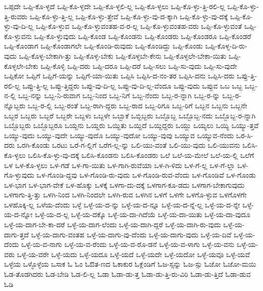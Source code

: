 {ಒಪ್ಪದೇ
ಒಪ್ಪಿ-ಕೊ-ಳ್ಳದೆ
ಒಪ್ಪಿ-ಕೊ-ಳ್ಳದೇ
ಒಪ್ಪಿ-ಕೊ-ಳ್ಳಲಿ-ಲ್ಲ
ಒಪ್ಪಿ-ಕೊ-ಳ್ಳಲು
ಒಪ್ಪಿ-ಕೊ-ಳ್ಳು-ತ್ತಿ-ರಲಿ-ಲ್ಲ
ಒಪ್ಪಿ-ಕೊ-ಳ್ಳು-ತ್ತಿ-ರುವರು
ಒಪ್ಪಿ-ಕೊ-ಳ್ಳು-ತ್ತಿ-ಲ್ಲ
ಒಪ್ಪಿ-ಕೊ-ಳ್ಳು-ತ್ತೇವೆ
ಒಪ್ಪಿ-ಕೊ-ಳ್ಳು-ವು-ದ-ಕ್ಕಾಗಿ
ಒಪ್ಪಿ-ಕೊ-ಳ್ಳು-ವು-ದಕ್ಕೆ
ಒಪ್ಪಿ-ಕೊ-ಳ್ಳು-ವು-ದಿ-ಲ್ಲ
ಒಪ್ಪಿ-ಕೊ-ಳ್ಳುವ
ಒಪ್ಪಿ-ಕೊ-ಳ್ಳುವಂತಹ-ವ-ರ-ಲ್ಲ
ಒಪ್ಪಿ-ಕೊ-ಳ್ಳುವಂತಹ-ವರು
ಒಪ್ಪಿ-ಕೊ-ಳ್ಳುವಂತೆ
ಒಪ್ಪಿ-ಕೊ-ಳ್ಳುವನು
ಒಪ್ಪಿ-ಕೊ-ಳ್ಳುವುದು
ಒಪ್ಪಿ-ಕೊಂಡ
ಒಪ್ಪಿ-ಕೊಂಡನು
ಒಪ್ಪಿ-ಕೊಂಡರು
ಒಪ್ಪಿ-ಕೊಂಡರೂ
ಒಪ್ಪಿ-ಕೊಂಡರೆ
ಒಪ್ಪಿ-ಕೊಂಡಾಗ
ಒಪ್ಪಿ-ಕೊಂಡಾಗಲೇ
ಒಪ್ಪಿ-ಕೊಂಡಿ-ರುವುದು
ಒಪ್ಪಿ-ಕೊಂಡಿದ್ದು
ಒಪ್ಪಿ-ಕೊಂಡು
ಒಪ್ಪಿ-ಕೊಳ್ಳ-ದಿ-ರು-ವುದು
ಒಪ್ಪಿ-ಕೊಳ್ಳ-ಬೇಕಾಗಿ-ತ್ತು
ಒಪ್ಪಿ-ಕೊಳ್ಳ-ಬೇಕು
ಒಪ್ಪಿ-ಕೊಳ್ಳಬೇ-ಕೇನು
ಒಪ್ಪಿ-ಕೊಳ್ಳಲೇ-ಬೇಕಾ-ಯಿತು
ಒಪ್ಪಿ-ಕೊಳ್ಳಲೇ-ಬೇಕು
ಒಪ್ಪಿ-ಕೊಳ್ಳಿ
ಒಪ್ಪಿ-ದರು
ಒಪ್ಪಿ-ದರೂ
ಒಪ್ಪಿ-ದರೆ
ಒಪ್ಪಿ-ಸಲು
ಒಪ್ಪಿ-ಸು-ವುದು
ಒಪ್ಪಿ-ಸು-ವುದೇ
ಒಪ್ಪಿಕೋ
ಒಪ್ಪಿಗೆ
ಒಪ್ಪಿಗೆ-ಯನ್ನು
ಒಪ್ಪಿಗೆ-ಯಾ-ಯಿತು
ಒಪ್ಪಿಸಿ
ಒಪ್ಪಿಸಿ-ದ-ನಂ-ತರ
ಒಪ್ಪಿಸಿ-ದನು
ಒಪ್ಪಿಸಿ-ದರು
ಒಪ್ಪು-ತ್ತಿ-ರಲಿ-ಲ್ಲ
ಒಪ್ಪು-ತ್ತಿ-ಲ್ಲ
ಒಪ್ಪು-ತ್ತಿದ್ದರು
ಒಪ್ಪು-ವು-ದಿ-ಲ್ಲ
ಒಪ್ಪು-ವು-ದಿ-ಲ್ಲ-ವೆಂದೂ
ಒಪ್ಪು-ವುದು
ಒಪ್ಪುವ
ಒಬ
ಒಬ್ಬ
ಒಬ್ಬ-ನ-ಲ್ಲಿ
ಒಬ್ಬ-ನನ್ನು
ಒಬ್ಬ-ನಿ-ರುವಾಗ
ಒಬ್ಬ-ನಿಂದ
ಒಬ್ಬ-ನಿಗೆ
ಒಬ್ಬ-ನೆಂದು
ಒಬ್ಬ-ರ-ನ್ನಾಗಿ
ಒಬ್ಬ-ರ-ನ್ನು
ಒಬ್ಬ-ರ-ನ್ನೊಬ್ಬರು
ಒಬ್ಬ-ರ-ಲ್ಲಿ
ಒಬ್ಬ-ರಂತೆ
ಒಬ್ಬ-ರಾಗಿ-ದ್ದರು
ಒಬ್ಬ-ರಾದ
ಒಬ್ಬ-ರಿಗೂ
ಒಬ್ಬ-ರಿಗೆ
ಒಬ್ಬನ
ಒಬ್ಬನು
ಒಬ್ಬನೇ
ಒಬ್ಬರ
ಒಬ್ಬರು
ಒಬ್ಬರೆ
ಒಬ್ಬರೇ
ಒಬ್ಬಳು
ಒಬ್ಬಳೇ
ಒಬ್ಬಾಕೆ
ಒಬ್ಬಿಬ್ಬರು
ಒಬ್ಬೊಬ್ಬ
ಒಬ್ಬೊಬ್ಬ-ನದು
ಒಬ್ಬೊಬ್ಬ-ರ-ನ್ನಾಗಿ
ಒಬ್ಬೊಬ್ಬರು
ಒಬ್ಬೊಬ್ಬರೂ
ಒಯ್ದನು
ಒಯ್ದರು
ಒಯ್ದಿತು
ಒಯ್ದಿದೆ
ಒಯ್ದಿದ್ದರು
ಒಯ್ದು
ಒಯ್ಯಲು
ಒಯ್ಯಿ
ಒಯ್ಯು-ತ್ತವೆ
ಒಯ್ಯು-ವುದು
ಒಯ್ಯು-ವುದೇ
ಒಯ್ಯು-ವುದೊ
ಒಯ್ಯು-ವುದೋ
ಒಯ್ಯು-ವುವು
ಒಯ್ಯುವ
ಒಯ್ಯುವ-ನೆಂದು
ಒರ-ಸಿ-ದರು
ಒರಗಿ-ಕೊಂಡು
ಒರಟು
ಒರೆ-ಗ-ಲ್ಲಿಗೆ
ಒರೆಗ-ಲ್ಲ-ನ್ನು
ಒಲಿ-ಯು-ವಂತೆ
ಒಲಿ-ಯು-ವುದು
ಒಲಿ-ಯುವನು
ಒಲಿಸಿ-ಕೊ-ಳ್ಳಲು
ಒಲಿಸಿ-ಕೊ-ಳ್ಳು-ವು-ದಕ್ಕೆ
ಒಲಿಸಿ-ಕೊಂಡನು
ಒಲಿಸಿ-ಕೊಂಡರು
ಒಲೆ
ಒಲೆ-ಯ-ಮೇಲೆ
ಒಲೆ-ಯ-ಲ್ಲಿ
ಒಲೆಗೆ
ಒಳ
ಒಳ-ಕೊ-ಳ್ಳಲು
ಒಳ-ಗಡೆ
ಒಳ-ಗಾ-ಯಿತು
ಒಳ-ಗಾಗಿ-ರುವೆಯಾ
ಒಳ-ಗಿ-ಳಿದು
ಒಳ-ಗೆ-ಲ್ಲ
ಒಳ-ಗೆ-ಲ್ಲಾ
ಒಳ-ಗೊ-ಳ್ಳುವುದು
ಒಳ-ಗೊಂಡಿ-ದ್ದವು
ಒಳ-ಗೊಂಡಿ-ರು-ವುದು
ಒಳ-ಗೊಂಡಿ-ರುವ-ವೆಂದು
ಒಳ-ಗೊಂಡಿವೆ
ಒಳ-ಗೊಂಡು
ಒಳ-ಭಾಗ
ಒಳ-ಭಾಗ-ವೇಕೆ
ಒಳ-ಹೊಕ್ಕು
ಒಳಕ್ಕೆ
ಒಳಗಾ-ದು-ದಕ್ಕೆ
ಒಳಗಾಗ-ಕೂ-ಡದು
ಒಳಗಾಗ-ಬೇಕಾಗುವುದು
ಒಳಗಾಗು-ತ್ತಿ-ತ್ತು
ಒಳಗಿ-ನಿಂದ
ಒಳಗಿ-ನಿಂದಲೇ
ಒಳಗಿ-ರುವ
ಒಳಗಿನ
ಒಳಗೆ
ಒಳಗೇ
ಒಳಗೊ-ಳ್ಳುವ
ಒಳಗೊಳಗೇ
ಒಳಹೊಕ್ಕಿ-ಲ್ಲ
ಒಳೆಯ-ದೆಂದು
ಒಳ್ಳೆ
ಒಳ್ಳೆ-ಯ-ದ-ನ್ನು
ಒಳ್ಳೆ-ಯ-ದ-ನ್ನೂ
ಒಳ್ಳೆ-ಯ-ದ-ನ್ನೆ-ಲ್ಲ
ಒಳ್ಳೆ-ಯ-ದ-ನ್ನೇ
ಒಳ್ಳೆ-ಯ-ದ-ನ್ನೋ
ಒಳ್ಳೆ-ಯ-ದ-ಲ್ಲ
ಒಳ್ಳೆ-ಯ-ದಕ್ಕೊ
ಒಳ್ಳೆ-ಯ-ದಾ-ಗಿದೆಯೆ
ಒಳ್ಳೆ-ಯ-ದಾ-ಯಿತು
ಒಳ್ಳೆ-ಯ-ದಾ-ವುದೂ
ಒಳ್ಳೆ-ಯ-ದಾಗ-ಬೇ-ಕಾ-ದರೆ
ಒಳ್ಳೆ-ಯ-ದಾಗ-ಲೆಂದು
ಒಳ್ಳೆ-ಯ-ದಾಗಿ-ದ್ದರೆ
ಒಳ್ಳೆ-ಯ-ದಾಗಿ-ರು-ವುದು
ಒಳ್ಳೆ-ಯ-ದಾಗು-ತ್ತದೆ
ಒಳ್ಳೆ-ಯ-ದಾಗು-ವಂತಹ
ಒಳ್ಳೆ-ಯ-ದಾಗು-ವು-ದೆಂದು
ಒಳ್ಳೆ-ಯ-ದಾಗು-ವುದು
ಒಳ್ಳೆ-ಯ-ದಿವೆ
ಒಳ್ಳೆ-ಯ-ದೆಂದು
ಒಳ್ಳೆ-ಯ-ವ-ನಾಗು
ಒಳ್ಳೆ-ಯ-ವ-ರೆಂದು
ಒಳ್ಳೆ-ಯ-ವ-ರೊ-ಡನೆ
ಒಳ್ಳೆ-ಯ-ವ-ಳಾಗು
ಒಳ್ಳೆ-ಯ-ವನು
ಒಳ್ಳೆ-ಯ-ವರು
ಒಳ್ಳೆ-ಯ-ವರೇ
ಒಳ್ಳೆ-ಯದು
ಒಳ್ಳೆ-ಯದೂ
ಒಳ್ಳೆ-ಯದೆ
ಒಳ್ಳೆ-ಯದೇ
ಒಳ್ಳೆ-ಯದೋ
ಒಳ್ಳೆ-ಯವೂ
ಒಳ್ಳೆ-ಯವೆ
ಒಳ್ಳೆಯ
ಒಳ್ಳೊಳ್ಳೆಯ
ಒಸಾಕ
ಓ
ಓಂ
ಓಔತ-ಣದ
ಓಕಾಕುರ
ಓಕ್ಲೆಂಡಿಗೆ
ಓಜ-ಸ್ಸನ್ನು
ಓಜ-ಸ್ಸು
ಓಜೋ
ಓಜೋ-ಮಯಿ
ಓಡ-ತೊಡಗಿದರು
ಓಡ-ಬೇಡಿ
ಓಡ-ಲಿ-ಲ್ಲ
ಓಡಾ
ಓಡಾ-ಡು-ತ್ತ
ಓಡಾ-ಡು-ತ್ತಿ-ರು-ವಿರಿ
ಓಡಾ-ಡು-ತ್ತಿದೆ
ಓಡಾ-ಡುವ
ಓಡಿ
}
